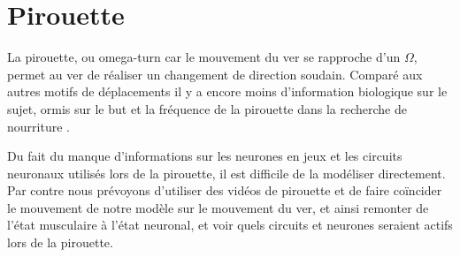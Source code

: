 
\section{Pirouette} %
\label{sec:Pirouette}

La pirouette, ou omega-turn car le mouvement du ver se rapproche d'un $\Omega$, permet au ver
de réaliser un changement de direction soudain. Comparé aux autres motifs de déplacements il y a encore
moins d'information biologique sur le sujet, ormis sur le but et la fréquence de la pirouette dans
la recherche de nourriture \cite{Gray2005}.

Du fait du manque d'informations sur les neurones en jeux et les circuits neuronaux utilisés lors de
la pirouette, il est difficile de la modéliser directement. Par contre nous prévoyons d'utiliser des
vidéos de pirouette et de faire coïncider le mouvement de notre modèle sur le mouvement du ver, et
ainsi remonter de l'état musculaire à l'état neuronal, et voir quels circuits et neurones seraient actifs
lors de la pirouette.


